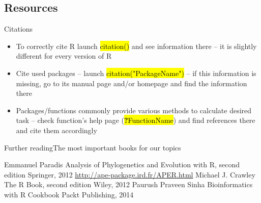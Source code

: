 \documentclass[compress, ucs, xelatex, 11pt, xcolor=svgnames,
  hyperref={
    bookmarks=true,
    unicode=true,
    colorlinks=true,
    pdftitle={Molecular data in R},
    plainpages=false,
    pdfauthor={Vojtech Zeisek},
    pdfsubject={Course about phylogeny and evolution in R},
    pdfcreator={XeLaTeX},
    pdfkeywords={R, evolution, phylogeny, molecular data},
    linkcolor=Tomato,
    anchorcolor=SaddleBrown,
    citecolor=Goldenrod,
    filecolor=DarkMagenta,
    menucolor=Sienna,
    urlcolor=DarkTurquoise,
    pdftex},
  url={hyphens, lowtilde} %
  ]{beamer}
\renewcommand{\texttt}[1]{\hl{\ttfamily #1}}
\begin{document}
\subsection{Resources}

\begin{frame}{Citations}
  \begin{itemize}
    \item To correctly cite R launch \texttt{citation()} and see information there -- it is slightly different for every version of R
    \item Cite used packages -- launch \texttt{citation("PackageName")} -- if this information is missing, go to its manual page and/or homepage and find the information there
    \item Packages/functions commonly provide various methods to calculate desired task -- check function's help page (\texttt{\textbf{?}FunctionName}) and find references there and cite them accordingly
  \end{itemize}
\end{frame}

\begin{frame}{Further reading}{The most important books for our topics}
  \begin{thebibliography}{1}
      Emmanuel Paradis
      \newblock Analysis of Phylogenetics and Evolution with R, second edition
      \newblock Springer, 2012
      \newblock \url{http://ape-package.ird.fr/APER.html}
      Michael J. Crawley
      \newblock The R Book, second edition
      \newblock Wiley, 2012
      Paurush Praveen Sinha
      \newblock Bioinformatics with R Cookbook
      \newblock Packt Publishing, 2014
  \end{thebibliography}
\end{frame}
\end{document}
